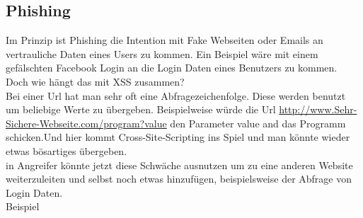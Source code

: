 \subsection{Phishing}
\label{sec:xss_phishing}
Im Prinzip ist Phishing die Intention mit Fake Webseiten oder Emails an vertrauliche Daten eines Users zu kommen. Ein Beispiel wäre mit einem gefälschten Facebook Login an die Login Daten eines Benutzers zu kommen. 
\\Doch wie hängt das mit XSS zusammen?\\Bei einer Url hat man sehr oft eine Abfragezeichenfolge. Diese werden benutzt um beliebige Werte zu übergeben. Beispielweise würde die Url 
\url{ http://www.Sehr-Sichere-Webseite.com/program?value} den Parameter value and das Programm schicken.Und hier kommt Cross-Site-Scripting ins Spiel und man könnte wieder etwas bösartiges übergeben.\\in Angreifer könnte jetzt diese Schwäche ausnutzen um zu eine anderen Website weiterzuleiten und selbst noch etwas hinzufügen, beispielsweise der Abfrage von Login Daten. \\Beispiel\\
